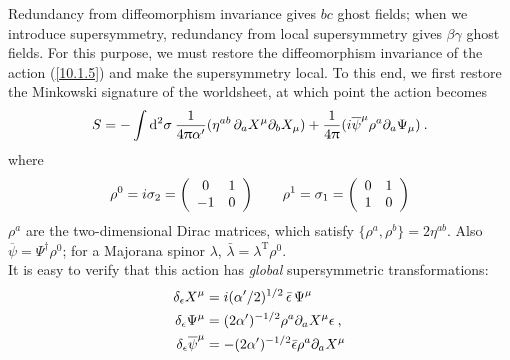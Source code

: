 \begin{tcolorbox}[breakable]
	Redundancy from diffeomorphism invariance gives $bc$ ghost fields; when we introduce supersymmetry, redundancy from local supersymmetry gives $\beta\gamma$ ghost fields. For this purpose, we must restore the diffeomorphism invariance of the action (\ref{10.1.5}) and make the supersymmetry local.
	To this end, we first restore the Minkowski signature of the worldsheet, at which point the action becomes
	\begin{equation*}
		S=-\int\mathrm{d}^{2}\sigma\:\frac{1}{4\uppi\alpha^{\prime}}(
		\eta^{ab}\,\partial_{a}X^{\mu}\partial_{b}X_{\mu})
		+\frac{1}{4\uppi}(i\overline{\psi}^{\mu}\rho^{a}\partial_{a}\Psi_{\mu})\:.
	\end{equation*}
	where
	\begin{equation*}
		\rho^{0}=i\sigma_{2}=
		\left(\begin{array}{cc}
			0&1  \\
			-1&0 
		\end{array}\right) \qquad
		\rho^{1}=\sigma_{1}=
		\left(\begin{array}{cc}
			0&1  \\
			1&0 
		\end{array}\right)
	\end{equation*}
	$\rho^{a}$ are the two-dimensional Dirac matrices, which satisfy $\{\rho^{a},\rho^{b}\}=2\eta^{ab}$. Also $\overline{\psi}=\Psi^{\dag}\rho^{0}$; for a Majorana spinor $\lambda$, $\bar{\lambda}=\lambda^{\mathrm{T}}\rho^{0}$.
	\\
	It is easy to verify that this action has \emph{global} supersymmetric transformations:
	\begin{align*}
		\delta_{\epsilon}X^{\mu}&=i(\alpha^{\prime}/2)^{1/2}\,\bar{\epsilon}\,\Psi^{\mu} \\
		\delta_{\epsilon}\Psi^{\mu}&=(2\alpha^{\prime})^{-1/2}\rho^{a}\partial_{a}X^{\mu}\epsilon\:, \\
		\delta _{\epsilon }\overline{\psi}^{\mu }&=-(2\alpha ^{\prime })^{-1/2}\bar{\epsilon}\rho ^{a}\partial _{a}X^{\mu }
	\end{align*}
	

\end{tcolorbox}
